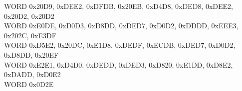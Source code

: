 \hspace*{25mm}WORD 0x20D9, 0xDEE2, 0xDFDB, 0x20EB, 0xD4D8, 0xDED8, 0xDEE2, 0x20D2, 0x20D2\\
\hspace*{25mm}WORD 0xE0DE, 0xD0D3, 0xD8DD, 0xDED7, 0xD0D2, 0xDDDD, 0xEEE3, 0x202C, 0xE3DF\\
\hspace*{25mm}WORD 0xD5E2, 0x20DC, 0xE1D8, 0xDEDF, 0xECDB, 0xDED7, 0xD0D2, 0xD8DD, 0x20EF\\
\hspace*{25mm}WORD 0xE2E1, 0xD4D0, 0xDEDD, 0xDED3, 0xD820, 0xE1DD, 0xD8E2, 0xDADD, 0xD0E2\\
\hspace*{25mm}WORD 0x0D2E\\

